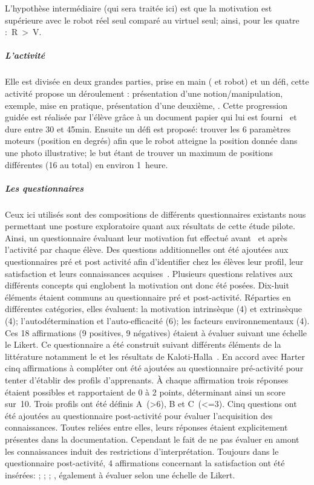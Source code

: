                     L'hypothèse intermédiaire (qui sera traitée ici) est que la motivation est supérieure avec le robot réel seul comparé au virtuel seul; ainsi, pour les quatre :~R~>~V.
                \subparagraph{L'activité}
                    Elle est divisée en deux grandes parties, prise en main ( et robot) et un défi, cette activité propose un déroulement : présentation d'une notion/manipulation, exemple, mise en pratique, présentation d'une deuxième, \etc. Cette progression guidée est réalisée par l'élève grâce à un document papier qui lui est fourni~ et dure entre 30 et 45min. Ensuite un défi est proposé: trouver les 6 paramètres moteurs (position en degrés) afin que le robot atteigne la position donnée dans une photo illustrative; le but étant de trouver un maximum de positions différentes (16 au total) en environ 1~heure.
                \subparagraph{Les questionnaires}
                    Ceux ici utilisés sont des compositions de différents questionnaires existants nous permettant une posture exploratoire quant aux résultats de cette étude pilote. Ainsi, un questionnaire évaluant leur motivation fut effectué avant~ et après l'activité par chaque élève. Des questions additionnelles ont été ajoutées aux questionnaires pré et post activité afin d'identifier chez les élèves leur profil, leur satisfaction et leurs connaissances acquises~. Plusieurs questions relatives aux différents concepts qui englobent la motivation ont donc été posées. Dix-huit éléments étaient communs au questionnaire pré et post-activité. Réparties en différentes catégories, elles évaluent: la motivation intrinsèque (4) et extrinsèque (4); l'autodétermination et l'auto-efficacité (6); les facteurs environnementaux (4). Ces 18 affirmations (9 positives, 9 négatives) étaient à évaluer suivant une échelle le Likert. Ce questionnaire a été construit suivant différents éléments de la littérature notamment le  et les résultats de Kaloti-Halla~.
                    En accord avec Harter~ cinq affirmations à compléter ont été ajoutées au questionnaire pré-activité pour tenter d'établir des profils d'apprenants. À chaque affirmation trois réponses étaient possibles et rapportaient de 0 à 2 points, déterminant ainsi un score sur~10. Trois profils ont été définis A~(>6), B et C~(<=3).
                    Cinq questions ont été ajoutées au questionnaire post-activité pour évaluer l'acquisition des connaissances. Toutes reliées entre elles, leurs réponses étaient explicitement présentes dans la documentation. Cependant le fait de ne pas évaluer en amont les connaissances induit des restrictions d'interprétation.
                    Toujours dans le questionnaire post-activité, 4 affirmations concernant la satisfaction ont été insérées: \Li{}; \ii{}; \iii{}; \iiii{}, également à évaluer selon une échelle de Likert.
